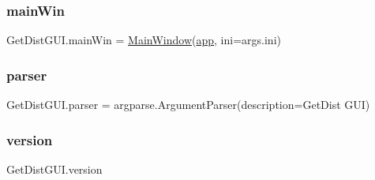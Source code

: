 \subsubsection{\texorpdfstring{main\+Win}{mainWin}}
{\footnotesize\ttfamily Get\+Dist\+G\+U\+I.\+main\+Win = \mbox{\hyperlink{classgetdist_1_1gui_1_1mainwindow_1_1MainWindow}{Main\+Window}}(\mbox{\hyperlink{namespaceGetDistGUI_a27a0f582f11b160e920880ef9c3b27bb}{app}}, ini=args.\+ini)}

\mbox{\label{namespaceGetDistGUI_af010defb28ed4e536d6ca1f71f39b66c}} 
\subsubsection{\texorpdfstring{parser}{parser}}
{\footnotesize\ttfamily Get\+Dist\+G\+U\+I.\+parser = argparse.\+Argument\+Parser(description=\textquotesingle{}Get\+Dist G\+UI\textquotesingle{})}

\mbox{\label{namespaceGetDistGUI_ad04559f89d673f1cbb0a67969d4c817a}} 
\subsubsection{\texorpdfstring{version}{version}}
{\footnotesize\ttfamily Get\+Dist\+G\+U\+I.\+version}

